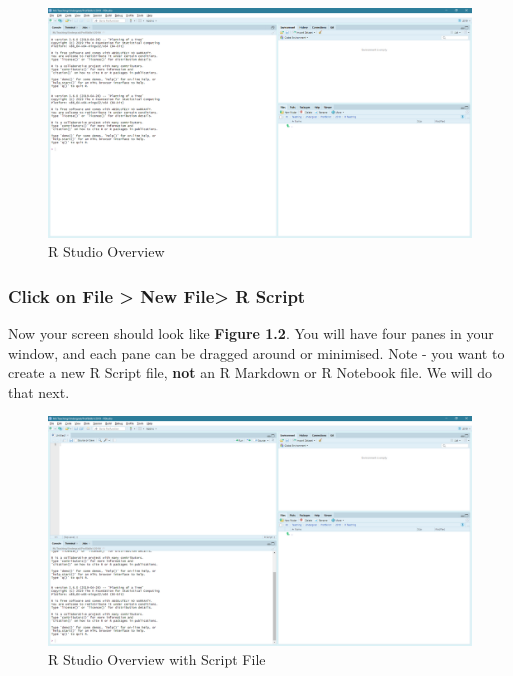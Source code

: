 \documentclass[
]{book}
\begin{document}
\begin{figure}

{\centering \includegraphics{images/02_install/rstud01} 

}

\caption{R Studio Overview}\label{fig:unnamed-chunk-6}
\end{figure}

\hypertarget{click-on-file-new-file-r-script}{%
\subsubsection{Click on File \textgreater{} New File\textgreater{} R Script}\label{click-on-file-new-file-r-script}}

Now your screen should look like \textbf{Figure 1.2}. You will have four panes in your window, and each pane can be dragged around or minimised. Note - you want to create a new R Script file, \textbf{not} an R Markdown or R Notebook file. We will do that next.

\begin{figure}

{\centering \includegraphics{images/02_install/rstud02} 

}

\caption{R Studio Overview with Script File}\label{fig:unnamed-chunk-7}
\end{figure}
\end{document}
